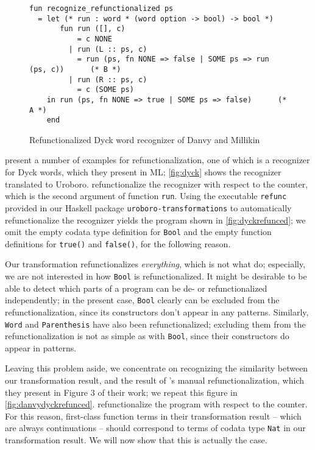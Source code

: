 \begin{figure}
\begin{lstlisting}
fun recognize_refunctionalized ps
  = let (* run : word * (word option -> bool) -> bool *)
       fun run ([], c) 
           = c NONE
         | run (L :: ps, c)
           = run (ps, fn NONE => false | SOME ps => run (ps, c))      (* B *)
         | run (R :: ps, c)
           = c (SOME ps)
    in run (ps, fn NONE => true | SOME ps => false)      (* A *)
    end
\end{lstlisting}
\caption{Refunctionalized Dyck word recognizer of Danvy and Millikin}
\label{fig:danvydyckrefunced}
\end{figure}

\citet{danvy09refunctionalization} present a number of examples for refunctionalization, one of which is a recognizer for Dyck words, which they present in ML; \autoref{fig:dyck} shows the recognizer translated to Uroboro. \citeauthor{danvy09refunctionalization} refunctionalize the recognizer with respect to the counter, which is the second argument of function \texttt{run}. Using the executable \texttt{refunc} provided in our Haskell package \texttt{uroboro-transformations} to automatically refunctionalize the recognizer yields the program shown in \autoref{fig:dyckrefunced}; we omit the empty codata type definition for \texttt{Bool} and the empty function definitions for \texttt{true()} and \texttt{false()}, for the following reason.

Our transformation refunctionalizes \textit{everything}, which is not what \citeauthor{danvy09refunctionalization} do; especially, we are not interested in how \texttt{Bool} is refunctionalized. It might be desirable to be able to detect which parts of a program can be de- or refunctionalized independently; in the present case, \texttt{Bool} clearly can be excluded from the refunctionalization, since its constructors don't appear in any patterns. Similarly, \texttt{Word} and \texttt{Parenthesis} have also been refunctionalized; excluding them from the refunctionalization is not as simple as with \texttt{Bool}, since their constructors do appear in patterns.

Leaving this problem aside, we concentrate on recognizing the similarity between our transformation result, and the result of \citeauthor{danvy09refunctionalization}'s manual refunctionalization, which they present in Figure 3 of their work; we repeat this figure in \autoref{fig:danvydyckrefunced}. \citeauthor{danvy09refunctionalization} refunctionalize the program with respect to the counter. For this reason, first-class function terms in their transformation result -- which are always continuations -- should correspond to terms of codata type \texttt{Nat} in our transformation result. We will now show that this is actually the case.

